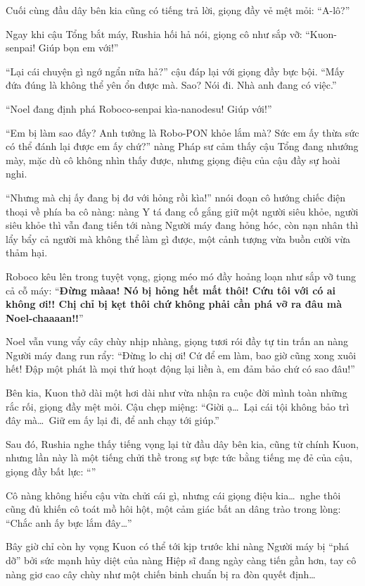 \documentclass[../main.tex]{subfiles}
\begin{document}
Cuối cùng đầu dây bên kia cũng có tiếng trả lời, giọng đầy vẻ mệt mỏi: ``A-lô?''

Ngay khi cậu Tổng bắt máy, Rushia hối hả nói, giọng cô như sắp vỡ: ``Kuon-senpai! Giúp bọn em với!''

``Lại cái chuyện gì ngớ ngẩn nữa hả?'' cậu đáp lại với giọng đầy bực bội. ``Mấy đứa đúng là không thể yên ổn được mà. Sao? Nói đi. Nhà anh đang có việc.''

``Noel đang định phá Roboco-senpai kìa-nanodesu! Giúp với!''

``Em bị làm sao đấy? Anh tưởng là Robo-PON khỏe lắm mà? Sức em ấy thừa sức có thể đánh lại được em ấy chứ?'' nàng Pháp sư cảm thấy cậu Tổng đang nhướng mày, mặc dù cô không nhìn thấy được, nhưng giọng điệu của cậu đầy sự hoài nghi.

``Nhưng mà chị ấy đang bị đơ với hỏng rồi kìa!'' nnói đoạn cô hướng chiếc điện thoại về phía ba cô nàng: nàng Y tá đang cố gắng giữ một người siêu khỏe, người siêu khỏe thì vẫn đang tiến tới nàng Người máy đang hỏng hóc, còn nạn nhân thì lẩy bẩy cả người mà không thể làm gì được, một cảnh tượng vừa buồn cười vừa thảm hại.

Roboco kêu lên trong tuyệt vọng, giọng méo mó đầy hoảng loạn như sắp vỡ tung cả cỗ máy: ``\textbf{Đừng màaa! Nó bị hỏng hết mất thôi! Cứu tôi với có ai không ơi!! Chị chỉ bị kẹt thôi chứ không phải cần phá vỡ ra đâu mà Noel-chaaaan!!}''

Noel vẫn vung vẩy cây chùy nhịp nhàng, giọng tươi rói đầy tự tin trấn an nàng Người máy đang run rẩy: ``Đừng lo chị ơi! Cứ để em làm, bao giờ cũng xong xuôi hết! Đập một phát là mọi thứ hoạt động lại liền à, em đảm bảo chứ có sao đâu!''

Bên kia, Kuon thở dài một hơi dài như vừa nhận ra cuộc đời mình toàn những rắc rối, giọng đầy mệt mỏi. Cậu chẹp miệng: ``Giời ạ\dots\ Lại cái tội không bảo trì đây mà\dots\ Giữ em ấy lại đi, để anh chạy tới giúp.''

Sau đó, Rushia nghe thấy tiếng vọng lại từ đầu dây bên kia, cũng từ chính Kuon, nhưng lần này là một tiếng chửi thề trong sự bực tức bằng tiếng mẹ đẻ của cậu, giọng đầy bất lực: ``''

Cô nàng không hiểu cậu vừa chửi cái gì, nhưng cái giọng điệu kia\dots\ nghe thôi cũng đủ khiến cô toát mồ hôi hột, một cảm giác bất an dâng trào trong lòng: ``Chắc anh ấy bực lắm đây\dots''

Bây giờ chỉ còn hy vọng Kuon có thể tới kịp trước khi nàng Người máy bị ``phá dỡ'' bởi sức mạnh hủy diệt của nàng Hiệp sĩ đang ngày càng tiến gần hơn, tay cô nàng giơ cao cây chùy như một chiến binh chuẩn bị ra đòn quyết định\dots
\end{document}
